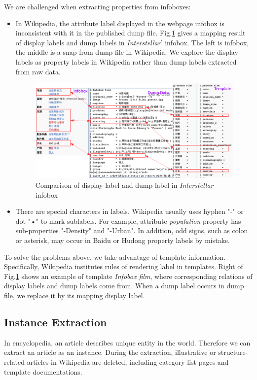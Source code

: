 \documentclass[runningheads,a4paper]{llncs}
\begin{document}
We are challenged when extracting properties from infoboxes:
\begin{itemize}
    \item In Wikipedia, the attribute label displayed in the webpage infobox is inconsistent with it in the published dump file. Fig.\ref{fig:infobox-template} gives a mapping result of display labels and dump labels in \emph{Interstellar}' infobox. The left is infobox, the middle is a snap from dump file in Wikipedia. We explore the display labels as property labels in Wikipedia rather than dump labels extracted from raw data.
    \begin{figure}[ht]
        \centerline{\includegraphics[width=1\columnwidth]{fig/infobox-template}}
        \caption{Comparison of display label and dump label in \emph{Interstellar} infobox}
        \label{fig:infobox-template}
    \end{figure}%
\item There are special characters in labels. Wikipedia usually uses hyphen "-" or dot "•" to mark sublabels. For example, attribute \emph{population} property has sub-properties "-Density" and "-Urban". In addition, odd signs, such as colon or asterisk, may occur in Baidu or Hudong property labels by mistake.
\end{itemize}

To solve the problems above, we take advantage of template information. Specifically, Wikipedia institutes rules of rendering label in templates. Right of Fig.\ref{fig:infobox-template} shows an example of template \emph{Infobox film}, where corresponding relations of display labels and dump labels come from. When a dump label occurs in dump file, we replace it by its mapping display label.

\subsection{Instance Extraction}
\label{sec:ie}
In encyclopedia, an article describes unique entity in the world. Therefore we can extract an article as an instance. During the extraction, illustrative or structure-related articles in Wikipedia are deleted, including category list pages and template documentations.
\end{document}
